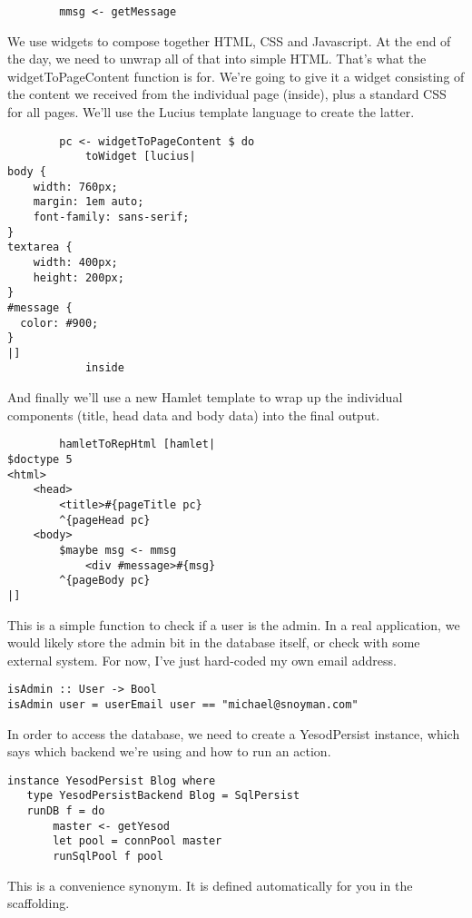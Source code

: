 \begin{lstlisting}
        mmsg <- getMessage
\end{lstlisting}

We use widgets to compose together HTML, CSS and Javascript. At the end of the day, we need to unwrap all of that into simple HTML. That's what the widgetToPageContent function is for. We're going to give it a widget consisting of the content we received from the individual page (inside), plus a standard CSS for all pages. We'll use the Lucius template language to create the latter.

\begin{lstlisting}
        pc <- widgetToPageContent $ do
            toWidget [lucius|
body {
    width: 760px;
    margin: 1em auto;
    font-family: sans-serif;
}
textarea {
    width: 400px;
    height: 200px;
}
#message {
  color: #900;
}
|]
            inside
\end{lstlisting}

And finally we'll use a new Hamlet template to wrap up the individual components (title, head data and body data) into the final output.

\begin{lstlisting}
        hamletToRepHtml [hamlet|
$doctype 5
<html>
    <head>
        <title>#{pageTitle pc}
        ^{pageHead pc}
    <body>
        $maybe msg <- mmsg
            <div #message>#{msg}
        ^{pageBody pc}
|]
\end{lstlisting}

This is a simple function to check if a user is the admin. In a real application, we would likely store the admin bit in the database itself, or check with some external system. For now, I've just hard-coded my own email address.

\begin{lstlisting}
isAdmin :: User -> Bool
isAdmin user = userEmail user == "michael@snoyman.com"
\end{lstlisting}

In order to access the database, we need to create a YesodPersist instance, which says which backend we're using and how to run an action.

\begin{lstlisting}
instance YesodPersist Blog where
   type YesodPersistBackend Blog = SqlPersist
   runDB f = do 
       master <- getYesod
       let pool = connPool master
       runSqlPool f pool
\end{lstlisting}

This is a convenience synonym. It is defined automatically for you in the scaffolding.

